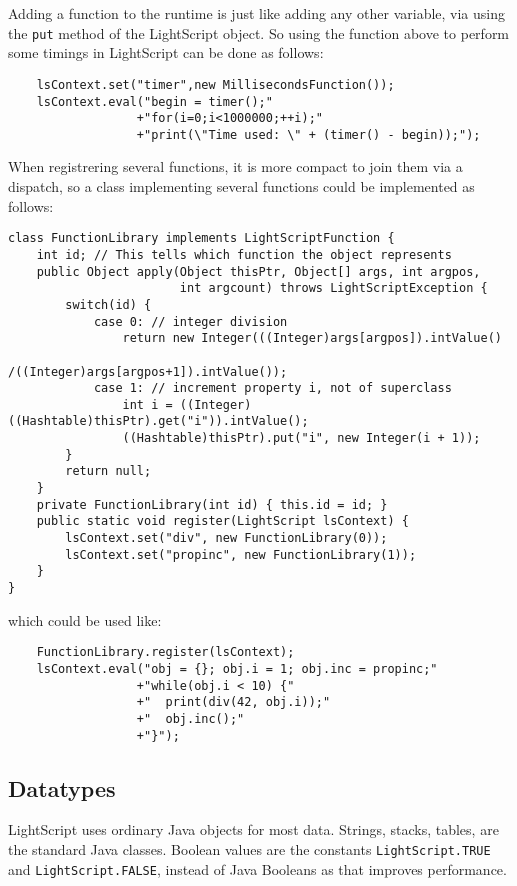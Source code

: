 \documentclass[11pt]{report}
\begin{document}
Adding a function to the runtime is just like adding any other variable,
via using the \verb|put| method of the LightScript object.
So using the function above to perform some timings in LightScript can be done as follows:
\begin{lstlisting}
    lsContext.set("timer",new MillisecondsFunction());
    lsContext.eval("begin = timer();"
                  +"for(i=0;i<1000000;++i);"
                  +"print(\"Time used: \" + (timer() - begin));");
\end{lstlisting}

When registrering several functions, it is more compact to join them via a dispatch, 
so a class implementing several functions could be implemented as follows:
\begin{lstlisting}
class FunctionLibrary implements LightScriptFunction {
    int id; // This tells which function the object represents
    public Object apply(Object thisPtr, Object[] args, int argpos, 
                        int argcount) throws LightScriptException {
        switch(id) {
            case 0: // integer division
                return new Integer(((Integer)args[argpos]).intValue()
                                  /((Integer)args[argpos+1]).intValue());
            case 1: // increment property i, not of superclass
                int i = ((Integer)((Hashtable)thisPtr).get("i")).intValue();
                ((Hashtable)thisPtr).put("i", new Integer(i + 1));
        }
        return null;
    }
    private FunctionLibrary(int id) { this.id = id; }
    public static void register(LightScript lsContext) {
        lsContext.set("div", new FunctionLibrary(0));
        lsContext.set("propinc", new FunctionLibrary(1));
    }
}
\end{lstlisting}
which could be used like:
\begin{lstlisting}
    FunctionLibrary.register(lsContext);
    lsContext.eval("obj = {}; obj.i = 1; obj.inc = propinc;"
                  +"while(obj.i < 10) {"
                  +"  print(div(42, obj.i));"
                  +"  obj.inc();"
                  +"}");
\end{lstlisting}

\subsection{Datatypes}
LightScript uses ordinary Java objects for most data.
Strings, stacks, tables, are the standard Java classes.
Boolean values are the constants \verb|LightScript.TRUE| and \verb|LightScript.FALSE|, instead of Java Booleans as that improves performance.
\end{document}
